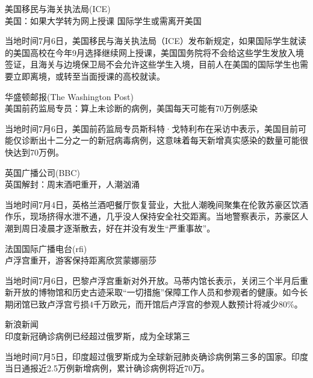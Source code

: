 \documentclass[]{article}
\begin{document}
\begin{center}
\textcolor{glaucous}{美国移民与海关执法局(ICE)}\\美国：如果大学转为网上授课 国际学生或需离开美国
\end{center}

当地时间7月6日，美国移民与海关执法局（ICE）发布新规定，如果国际学生就读的美国高校在今年9月选择继续网上授课，美国国务院将不会给这些学生发放入境签证，且海关与边境保卫局不会允许这些学生入境，目前人在美国的国际学生也需要立即离境，或转至当面授课的高校就读。

\begin{center}
\textcolor{glaucous}{华盛顿邮报(The Washington Post)}\\美国前药监局专员：算上未诊断的病例，美国每天可能有70万例感染
\end{center}

当地时间7月6日，美国前药监局专员斯科特·戈特利布在采访中表示，美国目前可能仅诊断出十二分之一的新冠病毒病例，这意味着每天新增真实感染的数量可能很快达到70万例。

\begin{center}
\textcolor{glaucous}{英国广播公司(BBC)}\\英国解封：周末酒吧重开，人潮汹涌
\end{center}

当地时间7月4日，英格兰酒吧餐厅恢复营业，大批人潮晚间聚集在伦敦苏豪区饮酒作乐，现场挤得水泄不通，几乎没人保持安全社交距离。当地警察表示，苏豪区人潮到周日凌晨才逐渐散去，好在并没有发生``严重事故''。

\begin{center}
\textcolor{glaucous}{法国国际广播电台(rfi)}\\卢浮宫重开，游客保持距离欣赏蒙娜丽莎
\end{center}

当地时间7月6日，巴黎卢浮宫重新对外开放。马蒂内馆长表示，关闭三个半月后重新开放的博物馆和历史古迹采取``一切措施''保障工作人员和参观者的健康。如今长期闭馆已致卢浮宫亏损4千万欧元，而开馆后卢浮宫的参观人数预计将减少80\%。

\begin{center}
\textcolor{glaucous}{新浪新闻}\\印度新冠确诊病例已经超过俄罗斯，成为全球第三
\end{center}

当地时间7月5日，印度超过俄罗斯成为全球新冠肺炎确诊病例第三多的国家。印度当日通报近2.5万例新增病例，累计确诊病例将近70万。

\vspace{5mm}
\end{document}
